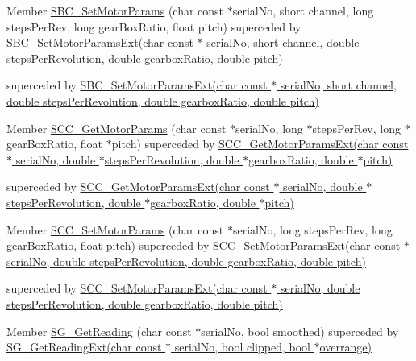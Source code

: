 \label{deprecated__deprecated000003}%
\hypertarget{deprecated__deprecated000003}{}%
Member \hyperlink{group___benchtop_stepper_ga218be9f99a58920a5cbb7c6b1b1609d0}{S\+B\+C\+\_\+\+Set\+Motor\+Params} (char const $\ast$serial\+No, short channel, long steps\+Per\+Rev, long gear\+Box\+Ratio, float pitch) superceded by \hyperlink{group___modular_stepper_ga3d1cdfba1bb56528389452436f4d2566}{S\+B\+C\+\_\+\+Set\+Motor\+Params\+Ext(char const $\ast$ serial\+No, short channel, double steps\+Per\+Revolution, double gearbox\+Ratio, double pitch)} 

superceded by \hyperlink{group___modular_stepper_ga3d1cdfba1bb56528389452436f4d2566}{S\+B\+C\+\_\+\+Set\+Motor\+Params\+Ext(char const $\ast$ serial\+No, short channel, double steps\+Per\+Revolution, double gearbox\+Ratio, double pitch)} 

\label{deprecated__deprecated000012}%
\hypertarget{deprecated__deprecated000012}{}%
Member \hyperlink{group___k_cube_stepper_ga3d910c2c0df2e18c0961915bb9cde909}{S\+C\+C\+\_\+\+Get\+Motor\+Params} (char const $\ast$serial\+No, long $\ast$steps\+Per\+Rev, long $\ast$gear\+Box\+Ratio, float $\ast$pitch) superceded by \hyperlink{group___t_cube_stepper_ga148dc8eea9be46ff3cf54ff77706b0e4}{S\+C\+C\+\_\+\+Get\+Motor\+Params\+Ext(char const $\ast$ serial\+No, double $\ast$steps\+Per\+Revolution, double $\ast$gearbox\+Ratio, double $\ast$pitch)} 

superceded by \hyperlink{group___t_cube_stepper_ga148dc8eea9be46ff3cf54ff77706b0e4}{S\+C\+C\+\_\+\+Get\+Motor\+Params\+Ext(char const $\ast$ serial\+No, double $\ast$steps\+Per\+Revolution, double $\ast$gearbox\+Ratio, double $\ast$pitch)} 

\label{deprecated__deprecated000011}%
\hypertarget{deprecated__deprecated000011}{}%
Member \hyperlink{group___k_cube_stepper_gabe6ed79b7914357d2cb81863850f214f}{S\+C\+C\+\_\+\+Set\+Motor\+Params} (char const $\ast$serial\+No, long steps\+Per\+Rev, long gear\+Box\+Ratio, float pitch) superceded by \hyperlink{group___t_cube_stepper_ga4fc298289e7f7ab90e8c2faeb8900ee6}{S\+C\+C\+\_\+\+Set\+Motor\+Params\+Ext(char const $\ast$ serial\+No, double steps\+Per\+Revolution, double gearbox\+Ratio, double pitch)} 

superceded by \hyperlink{group___t_cube_stepper_ga4fc298289e7f7ab90e8c2faeb8900ee6}{S\+C\+C\+\_\+\+Set\+Motor\+Params\+Ext(char const $\ast$ serial\+No, double steps\+Per\+Revolution, double gearbox\+Ratio, double pitch)} 

\label{deprecated__deprecated000019}%
\hypertarget{deprecated__deprecated000019}{}%
Member \hyperlink{group___t_cube_strain_gauge_gaa53d04f6d00cf6160c19449e741a2314}{S\+G\+\_\+\+Get\+Reading} (char const $\ast$serial\+No, bool smoothed) superceded by \hyperlink{group___t_cube_strain_gauge_gaf24abc057f94d87f371652ef29696591}{S\+G\+\_\+\+Get\+Reading\+Ext(char const $\ast$ serial\+No, bool clipped, bool $\ast$overrange)} 


